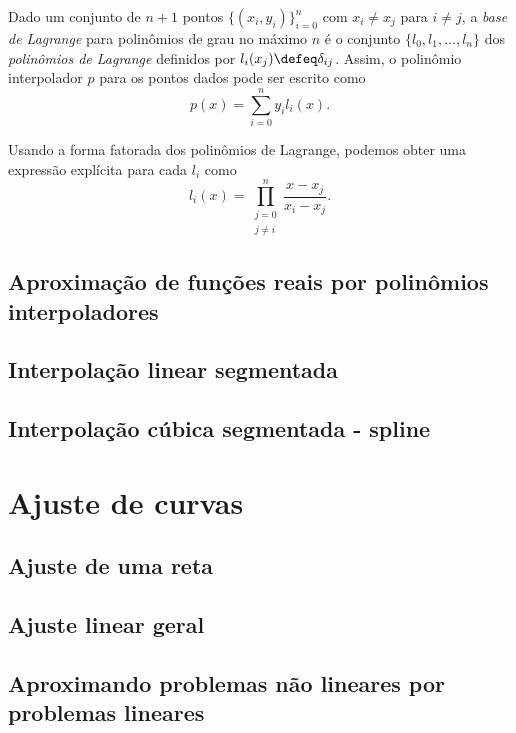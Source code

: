\documentclass{article}
\begin{document}
Dado um conjunto de \(n+1\) pontos \(\{(x_i, y_i)\}_{i=0}^{n}\) com \(x_i \neq x_j\) para \(i \neq j\), a \emph{base de Lagrange} para polinômios de grau no máximo \(n\) é o conjunto \(\{l_0, l_1, \ldots, l_n\}\) dos \emph{polinômios de Lagrange} definidos por \(l_i(x_j) \defeq \delta_{ij}\).
Assim, o polinômio interpolador \(p\) para os pontos dados pode ser escrito como
\begin{equation}
    p(x) = \sum_{i=0}^{n} y_i l_i(x).
\end{equation}

Usando a forma fatorada dos polinômios de Lagrange, podemos obter uma expressão explícita para cada \(l_i\) como
\begin{equation}
    l_i(x) = \prod_{\substack{j=0 \\ j \neq i}}^{n} \frac{x - x_j}{x_i - x_j}.
\end{equation}


\subsection{Aproximação de funções reais por polinômios interpoladores}
\subsection{Interpolação linear segmentada}
\subsection{Interpolação cúbica segmentada - spline}

\section{Ajuste de curvas}

\subsection{Ajuste de uma reta}
\subsection{Ajuste linear geral}
\subsection{Aproximando problemas não lineares por problemas lineares}
\end{document}
